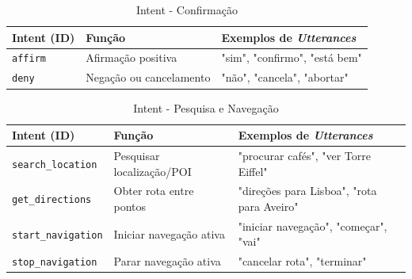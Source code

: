 \documentclass{report}
\begin{document}
\begin{longtable}{p{} p{} p{}}
    \caption{Intent - Confirmação} 
    \label{tab:intents_confirmacao} \\
    
    \toprule
    \textbf{Intent (ID)} & \textbf{Função} & \textbf{Exemplos de \textit{Utterances}} \\
    \midrule
    \endfirsthead
    \endlastfoot
    
    \texttt{affirm} & Afirmação positiva & "sim", "confirmo", "está bem" \\
    \texttt{deny} & Negação ou cancelamento & "não", "cancela", "abortar" \\
\end{longtable}

\begin{longtable}{p{} p{} p{}}
    \caption{Intent - Pesquisa e Navegação} 
    \label{tab:intents_pesquisa_Navegacao} \\
    
    \toprule
    \textbf{Intent (ID)} & \textbf{Função} & \textbf{Exemplos de \textit{Utterances}} \\
    \midrule
    \endfirsthead
    \endlastfoot
    
    \texttt{search\_location} & Pesquisar localização/POI & "procurar cafés", "ver Torre Eiffel" \\
    \texttt{get\_directions} & Obter rota entre pontos & "direções para Lisboa", "rota para Aveiro" \\
    \texttt{start\_navigation} & Iniciar navegação ativa & "iniciar navegação", "começar", "vai" \\
    \texttt{stop\_navigation} & Parar navegação ativa & "cancelar rota", "terminar" \\
\end{longtable}
\end{document}
